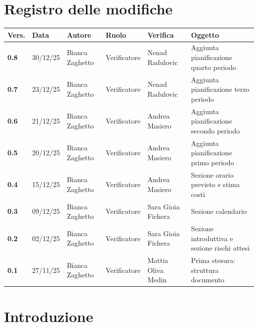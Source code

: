 \documentclass[a4paper,12pt]{article}
\begin{document}


\newpage
\section*{Registro delle modifiche}

\begin{table}[h!]
\begin{tabularx}{\textwidth}{|l|l|l|l|L|L|}
\hline
\textbf{Vers.} & \textbf{Data} & \textbf{Autore} & \textbf{Ruolo} & \textbf{Verifica} & \textbf{Oggetto} \\
\hline
\textbf{0.8} & 30/12/25 & Bianca Zaghetto & Verificatore & Nenad Radulovic & Aggiunta pianificazione quarto periodo \\
\hline
\textbf{0.7} & 23/12/25 & Bianca Zaghetto & Verificatore & Nenad Radulovic & Aggiunta pianificazione terzo periodo \\
\hline
\textbf{0.6} & 21/12/25 & Bianca Zaghetto & Verificatore & Andrea Masiero & Aggiunta pianificazione secondo periodo \\
\hline
\textbf{0.5} & 20/12/25 & Bianca Zaghetto & Verificatore & Andrea Masiero & Aggiunta pianificazione primo periodo \\
\hline
\textbf{0.4} & 15/12/25 & Bianca Zaghetto & Verificatore & Andrea Masiero & Sezione orario previsto e stima costi \\
\hline
\textbf{0.3} & 09/12/25 & Bianca Zaghetto & Verificatore & Sara Gioia Fichera & Sezione calendario \\
\hline
\textbf{0.2} & 02/12/25 & Bianca Zaghetto & Verificatore & Sara Gioia Fichera & Sezione introduttiva e sezione rischi attesi \\
\hline
\textbf{0.1} & 27/11/25 & Bianca Zaghetto & Verificatore & Mattia Oliva Medin & Prima stesura: struttura documento \\
\hline
\end{tabularx}
\end{table}

\newpage
\tableofcontents

\newpage
\listoffigures

\newpage
\listoftables

\newpage

\section{Introduzione}
\end{document}
